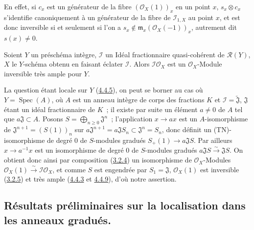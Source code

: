 En effet, si $c_x$ est un générateur de la fibre $(\mathcal{O}_X(1))_x$ en un
point $x$, $s_x\otimes c_x$ s'identifie canoniquement à un générateur de la
fibre de $\mathcal{I}_{1,X}$ au point $x$, et est donc inversible si et
seulement si l'on a
$s_x\notin\mathfrak{m}_x(\mathcal{O}_X(-1))_x$, autrement dit
$s(x)\neq0$.

\begin{proposition}[8.1.11]
\label{II.8.1.11-fr}
Soient $Y$ un préschéma intègre, $\mathcal{I}$ un Idéal fractionnaire
quasi-cohérent de $\mathcal{R}(Y)$, $X$ le $Y$-schéma obtenu en faisant éclater
$\mathcal{I}$. Alors $\mathcal{I}\mathcal{O}_X$ est un
$\mathcal{O}_X$-Module inversible très ample pour $Y$.
\end{proposition}

La question étant locale sur $Y$ (\hyperref[II.4.4.5-fr]{4.4.5}), on peut se
borner au cas où $Y=\operatorname{Spec}(A)$, où $A$ est un anneau intègre de
corps des fractions $K$ et $\mathcal{I}=\widetilde{\mathfrak{J}}$,
$\mathfrak{J}$ étant un idéal fractionnaire de $K$~; il existe par suite un
élément $a\neq0$ de $A$ tel que $a\mathfrak{J}\subset A$. Posons
$S=\bigoplus_{n\geq0}\mathfrak{J}^n$~; l'application $x\to ax$ est un
$A$-isomorphisme de $\mathfrak{J}^{n+1}=(S(1))_n$ sur
$a\mathfrak{J}^{n+1}=a\mathfrak{J}S_n\subset\mathfrak{J}^n=S_n$,
donc définit un (TN)-isomorphisme de degré $0$ de $S$-modules gradués
$S_+(1)\to a\mathfrak{J}S$. Par ailleurs $x\to a^{-1}x$ est un
isomorphisme de degré $0$ de $S$-modules gradués
$a\mathfrak{J}S\xrightarrow{\sim}\mathfrak{J}S$. On obtient donc ainsi par
composition (\hyperref[II.3.2.4-fr]{3.2.4}) un isomorphisme de
$\mathcal{O}_X$-Modules
$\mathcal{O}_X(1)\xrightarrow{\sim}\mathcal{I}\mathcal{O}_X$, et comme $S$
est engendrée par $S_1=\mathfrak{J}$, $\mathcal{O}_X(1)$ est inversible
(\hyperref[II.3.2.5-fr]{3.2.5}) et très ample
(\hyperref[II.4.4.3-fr]{4.4.3} et \hyperref[II.4.4.9-fr]{4.4.9}), d'où notre
assertion.

\subsection{Résultats préliminaires sur la localisation dans les anneaux gradués.}
\label{subsection:II.8.2-fr}

